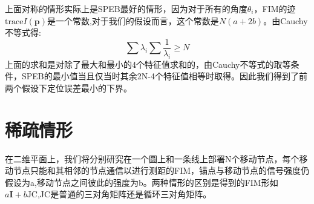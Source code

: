 \documentclass[12pt]{article}
\theoremstyle{remark}
\begin{document}
上面对称的情形实际上是SPEB最好的情形，因为对于所有的角度$\theta_i$，FIM的迹$\text{trace}I(\bm{p})$是一个常数,对于我们的假设而言，这个常数是$N(a+2b)$。由Cauchy不等式得:
\begin{equation}
\sum \lambda_i \sum \frac{1}{\lambda_i}\geq N
\end{equation}
上面的求和是对除了最大和最小的4个特征值求和的，由Cauchy不等式的取等条件，SPEB的最小值当且仅当时其余2N-4个特征值相等时取得。因此我们得到了前两个假设下定位误差最小的下界。
\section{稀疏情形}
在二维平面上，我们将分别研究在一个圆上和一条线上部署N个移动节点，每个移动节点只能和其相邻的节点通信以进行测距的FIM，锚点与移动节点的信号强度仍假设为a,移动节点之间彼此的强度为b。两种情形的区别是得到的FIM形如$a\bm{I}+b\text{JC}$,JC是普通的三对角矩阵还是循环三对角矩阵。
\end{document}
